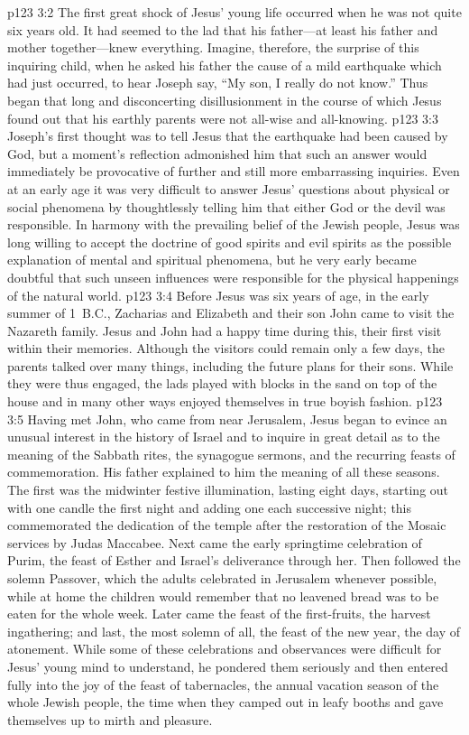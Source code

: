 \pc \vs p123 3:2 The first great shock of Jesus’ young life occurred when he was not quite six years old. It had seemed to the lad that his father---at least his father and mother together---knew everything. Imagine, therefore, the surprise of this inquiring child, when he asked his father the cause of a mild earthquake which had just occurred, to hear Joseph say, “My son, I really do not know.” Thus began that long and disconcerting disillusionment in the course of which Jesus found out that his earthly parents were not all\hyp{}wise and all\hyp{}knowing.
\vs p123 3:3 Joseph’s first thought was to tell Jesus that the earthquake had been caused by God, but a moment’s reflection admonished him that such an answer would immediately be provocative of further and still more embarrassing inquiries. Even at an early age it was very difficult to answer Jesus’ questions about physical or social phenomena by thoughtlessly telling him that either God or the devil was responsible. In harmony with the prevailing belief of the Jewish people, Jesus was long willing to accept the doctrine of good spirits and evil spirits as the possible explanation of mental and spiritual phenomena, but he very early became doubtful that such unseen influences were responsible for the physical happenings of the natural world.
\pc \vs p123 3:4 Before Jesus was six years of age, in the early summer of 1~B.C., Zacharias and Elizabeth and their son John came to visit the Nazareth family. Jesus and John had a happy time during this, their first visit within their memories. Although the visitors could remain only a few days, the parents talked over many things, including the future plans for their sons. While they were thus engaged, the lads played with blocks in the sand on top of the house and in many other ways enjoyed themselves in true boyish fashion.
\pc \vs p123 3:5 Having met John, who came from near Jerusalem, Jesus began to evince an unusual interest in the history of Israel and to inquire in great detail as to the meaning of the Sabbath rites, the synagogue sermons, and the recurring feasts of commemoration. His father explained to him the meaning of all these seasons. The first was the midwinter festive illumination, lasting eight days, starting out with one candle the first night and adding one each successive night; this commemorated the dedication of the temple after the restoration of the Mosaic services by Judas Maccabee. Next came the early springtime celebration of Purim, the feast of Esther and Israel’s deliverance through her. Then followed the solemn Passover, which the adults celebrated in Jerusalem whenever possible, while at home the children would remember that no leavened bread was to be eaten for the whole week. Later came the feast of the first\hyp{}fruits, the harvest ingathering; and last, the most solemn of all, the feast of the new year, the day of atonement. While some of these celebrations and observances were difficult for Jesus’ young mind to understand, he pondered them seriously and then entered fully into the joy of the feast of tabernacles, the annual vacation season of the whole Jewish people, the time when they camped out in leafy booths and gave themselves up to mirth and pleasure.
